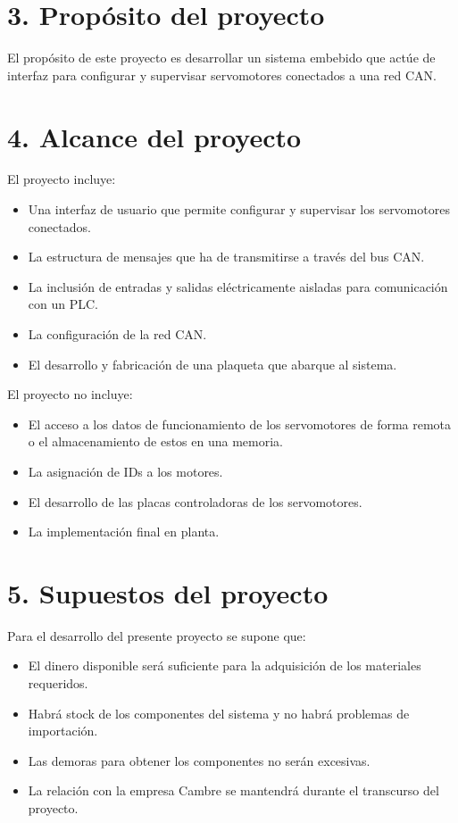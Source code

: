 \documentclass[
11pt, %
]{charter}
\begin{document}
\section{3. Propósito del proyecto}
\label{sec:proposito}

El propósito de este proyecto es desarrollar un sistema embebido que actúe de interfaz para configurar y supervisar servomotores conectados a una red CAN.

\section{4. Alcance del proyecto}
\label{sec:alcance}

El proyecto incluye:

\begin{itemize}
	\item Una interfaz de usuario que permite configurar y supervisar los servomotores conectados.
	\item La estructura de mensajes que ha de transmitirse a través del bus CAN.
	\item La inclusión de entradas y salidas eléctricamente aisladas para comunicación con un PLC.
	\item La configuración de la red CAN.
	\item El desarrollo y fabricación de una plaqueta que abarque al sistema.
\end{itemize}

El proyecto no incluye:

\begin{itemize}
	\item El acceso a los datos de funcionamiento de los servomotores de forma remota o el almacenamiento de estos en una memoria.
	\item La asignación de IDs a los motores.
	\item El desarrollo de las placas controladoras de los servomotores.
	\item La implementación final en planta.
\end{itemize}

\section{5. Supuestos del proyecto}
\label{sec:supuestos}

Para el desarrollo del presente proyecto se supone que:

\begin{itemize}
	\item El dinero disponible será suficiente para la adquisición de los materiales requeridos.
	\item Habrá stock de los componentes del sistema y no habrá problemas de importación. 
	\item Las demoras para obtener los componentes no serán excesivas.
	\item La relación con la empresa Cambre se mantendrá durante el transcurso del proyecto.
\end{itemize}
\end{document}
